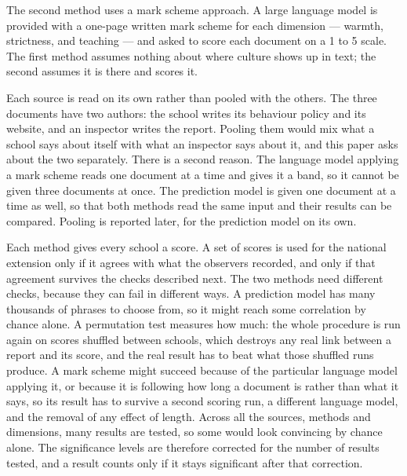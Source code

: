 The second method uses a mark scheme approach. A large language model is provided with a one-page written mark scheme for each dimension --- warmth, strictness, and teaching --- and asked to score each document on a 1 to 5 scale. The first method assumes nothing about where
culture shows up in text; the second assumes it is there and scores it.

Each source is read on its own rather than pooled with the others. The three documents have two authors: the school writes its behaviour policy and its website, and an inspector writes the report. Pooling them would mix what a school says about itself with what an inspector says about it, and this paper asks about the two separately. There is a second reason. The language model applying a mark scheme reads one document at a time and gives it a band, so it cannot be given three documents at once. The prediction model is given one document at a time as well, so that both methods read the same input and their results can be compared. Pooling is reported later, for the prediction model on its own.

Each method gives every school a score. A set of scores is used for the national extension only if it agrees with what the observers recorded, and only if that agreement survives the checks described next. The two methods need different checks, because they can fail in different ways. A prediction model has many thousands of phrases to choose from, so it might reach some correlation by chance alone. A permutation test measures how much: the whole procedure is run again on scores shuffled between schools, which destroys any real link between a report and its score, and the real result has to beat what those shuffled runs produce. A mark scheme might succeed because of the particular language model applying it, or because it is following how long a document is rather than what it says, so its result has to survive a second scoring run, a different language model, and the removal of any effect of length. Across all the sources, methods and dimensions, many results are tested, so some would look convincing by chance alone. The significance levels are therefore corrected for the number of results tested, and a result counts only if it stays significant after that correction.


